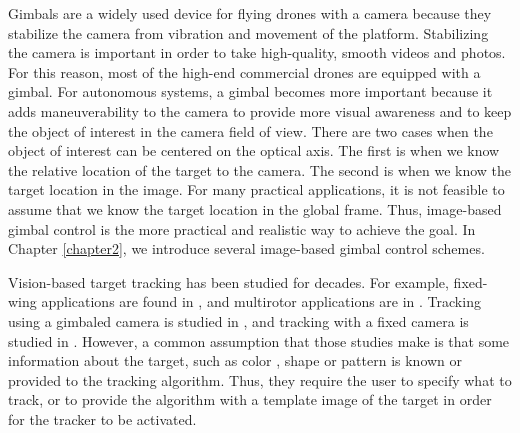 Gimbals are a widely used device for flying drones with a camera because they stabilize the camera from vibration and movement of the platform. Stabilizing the camera is important in order to take high-quality, smooth videos and photos. For this reason, most of the high-end commercial drones are equipped with a gimbal. For autonomous systems, a gimbal becomes more important because it adds maneuverability to the camera to provide more visual awareness and to keep the object of interest in the camera field of view. There are two cases when the object of interest can be centered on the optical axis. The first is when we know the relative location of the target to the camera. The second is when we know the target location in the image. For many practical applications, it is not feasible to assume that we know the target location in the global frame. Thus, image-based gimbal control is the more practical and realistic way to achieve the goal. In Chapter \ref{chapter2}, we introduce several image-based gimbal control schemes.

Vision-based target tracking has been studied for decades. For example, fixed-wing applications are found in \cite{Saunders2011, Rysdyk2006, Dobrokhodov2006, Qadir2011, Theodorakopoulos2008}, and multirotor applications are in \cite{Pestana2013, Thomas2017, Teuliere2011, Kim2013}. Tracking using a gimbaled camera is studied in \cite{Rysdyk2006, Dobrokhodov2006, Hurak2012}, and tracking with a fixed camera is studied in \cite{Saunders2011, Theodorakopoulos2008, Pestana2013, Thomas2017, Teuliere2011, Kim2013}. However, a common assumption that those studies make is that some information about the target, such as color \cite{Teuliere2011, Kim2013}, shape \cite{Thomas2017} or pattern \cite{Lee2012} is known or provided to the tracking algorithm. Thus, they require the user to specify what to track, or to provide the algorithm with a template image of the target in order for the tracker to be activated. 

